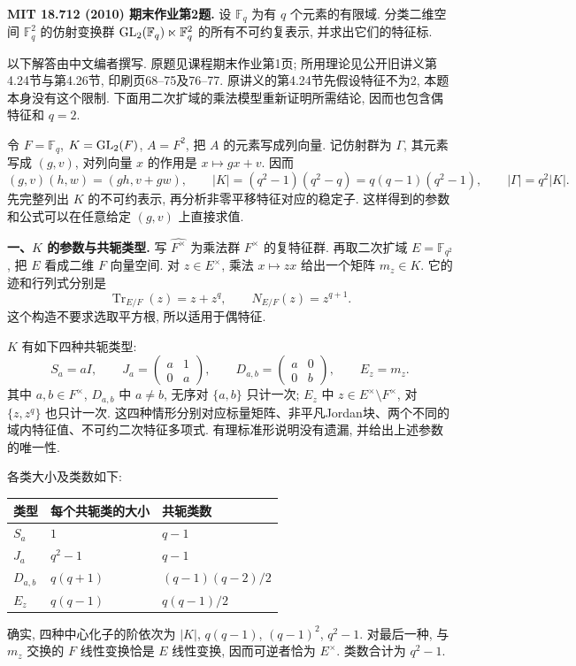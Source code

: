 \begin{exercise}\label{final:2}
\textbf{MIT 18.712 (2010) 期末作业第2题.}
设 $\mathbb F_q$ 为有 $q$ 个元素的有限域. 分类二维空间 $\mathbb F_q^2$ 的仿射变换群
$\operatorname{GL}_2(\mathbb F_q)\ltimes\mathbb F_q^2$ 的所有不可约复表示, 并求出它们的特征标.
\end{exercise}

以下解答由中文编者撰写. 原题见课程期末作业第1页; 所用理论见公开旧讲义第4.24节与第4.26节, 印刷页68--75及76--77. 原讲义的第4.24节先假设特征不为2, 本题本身没有这个限制. 下面用二次扩域的乘法模型重新证明所需结论, 因而也包含偶特征和 $q=2$.

\begin{solution}
令 $F=\mathbb F_q$, $K=\operatorname{GL}_2(F)$, $A=F^2$, 把 $A$ 的元素写成列向量. 记仿射群为 $\Gamma$, 其元素写成 $(g,v)$, 对列向量 $x$ 的作用是 $x\mapsto gx+v$. 因而
\[
 (g,v)(h,w)=(gh,v+gw),\qquad
 |K|=(q^2-1)(q^2-q)=q(q-1)(q^2-1),\qquad |\Gamma|=q^2|K|.
\]
先完整列出 $K$ 的不可约表示, 再分析非零平移特征对应的稳定子. 这样得到的参数和公式可以在任意给定 $(g,v)$ 上直接求值.

\textbf{一、$K$ 的参数与共轭类型.}
写 $\widehat{F^\times}$ 为乘法群 $F^\times$ 的复特征群. 再取二次扩域 $E=\mathbb F_{q^2}$, 把 $E$ 看成二维 $F$ 向量空间. 对 $z\in E^\times$, 乘法 $x\mapsto zx$ 给出一个矩阵 $m_z\in K$. 它的迹和行列式分别是
\[
 \operatorname{Tr}_{E/F}(z)=z+z^q,\qquad N_{E/F}(z)=z^{q+1}.
\]
这个构造不要求选取平方根, 所以适用于偶特征.

$K$ 有如下四种共轭类型:
\[
 S_a=aI,\qquad
 J_a=\begin{pmatrix}a&1\\0&a\end{pmatrix},\qquad
 D_{a,b}=\begin{pmatrix}a&0\\0&b\end{pmatrix},\qquad E_z=m_z.
\]
其中 $a,b\in F^\times$, $D_{a,b}$ 中 $a\ne b$, 无序对 $\{a,b\}$ 只计一次; $E_z$ 中 $z\in E^\times\setminus F^\times$, 对 $\{z,z^q\}$ 也只计一次. 这四种情形分别对应标量矩阵、非平凡Jordan块、两个不同的域内特征值、不可约二次特征多项式. 有理标准形说明没有遗漏, 并给出上述参数的唯一性.

各类大小及类数如下:
\begin{center}
\begin{tabular}{@{}lll@{}}
\toprule
类型 & 每个共轭类的大小 & 共轭类数 \\
\midrule
$S_a$ & $1$ & $q-1$ \\
$J_a$ & $q^2-1$ & $q-1$ \\
$D_{a,b}$ & $q(q+1)$ & $(q-1)(q-2)/2$ \\
$E_z$ & $q(q-1)$ & $q(q-1)/2$ \\
\bottomrule
\end{tabular}
\end{center}
确实, 四种中心化子的阶依次为 $|K|$, $q(q-1)$, $(q-1)^2$, $q^2-1$. 对最后一种, 与 $m_z$ 交换的 $F$ 线性变换恰是 $E$ 线性变换, 因而可逆者恰为 $E^\times$. 类数合计为 $q^2-1$.


\end{solution}

